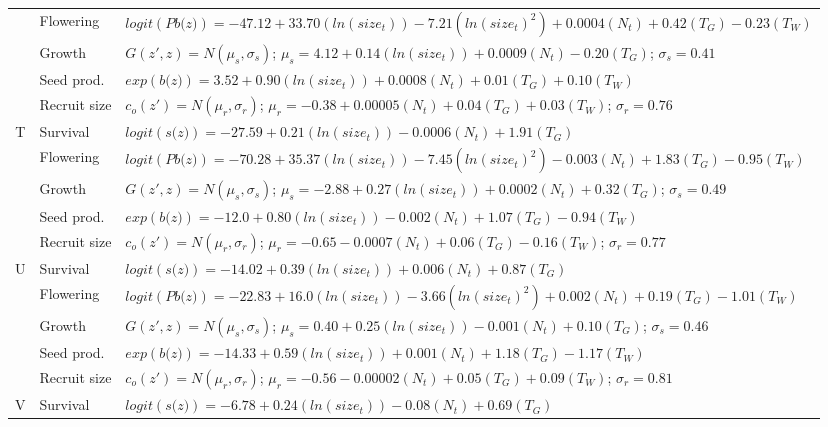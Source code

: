 \documentclass[12pt, letterpaper]{article}
\begin{document}
\begin{spacing}{1.3}
\begin{longtable}[ht]{c|l|p{}}
         & Flowering  & $logit(\textit{Pb(z)}) = -47.12 + 33.70(ln(size_t)) -7.21(ln(size_t)^2) +0.0004 (N_t) + 0.42 (T_G) - 0.23 (T_W)$ \\
         \rowcolor[gray]{.95}& Growth  &  $G(z',z) = N(\mu_s, \sigma_s)$; $\mu_s = 4.12 + 0.14(ln(size_t)) +0.0009(N_t) -0.20 (T_G)$; $\sigma_s = 0.41$\\
         & Seed prod.  & $exp(\textit{b(z)}) = 3.52 + 0.90(ln(size_t)) + 0.0008 (N_t) + 0.01 (T_G) + 0.10 (T_W)$  \\
         \rowcolor[gray]{.95}& Recruit size  &  $c_o(z') = N(\mu_r, \sigma_r)$; $\mu_r = -0.38 + 0.00005 (N_t) + 0.04 (T_G) + 0.03 (T_W) $; $\sigma_r = 0.76$ \\
         \hline
         T  &  Survival  &  $logit(\textit{s(z)})= -27.59 + 0.21(ln(size_t)) -0.0006(N_t) + 1.91 (T_G)$ \\
         \rowcolor[gray]{.95}& Flowering  & $logit(\textit{Pb(z)})  = -70.28 + 35.37(ln(size_t)) -7.45(ln(size_t)^2) - 0.003 (N_t) + 1.83 (T_G) - 0.95 (T_W)$ \\
         & Growth  &  $G(z',z) = N(\mu_s, \sigma_s)$; $\mu_s = -2.88 + 0.27(ln(size_t)) +0.0002 (N_t) + 0.32 (T_G)$; $\sigma_s = 0.49$\\
         \rowcolor[gray]{.95}& Seed prod.  & $exp(\textit{b(z)}) = -12.0 + 0.80(ln(size_t)) -0.002 (N_t) + 1.07 (T_G) - 0.94 (T_W)$  \\
         & Recruit size  &  $c_o(z') = N(\mu_r, \sigma_r)$; $\mu_r = -0.65 -0.0007 (N_t) + 0.06 (T_G) - 0.16 (T_W) $; $\sigma_r = 0.77$ \\
         \hline
         \rowcolor[gray]{.95}U  &  Survival  &  $logit(\textit{s(z)})= -14.02 + 0.39(ln(size_t)) + 0.006(N_t) + 0.87 (T_G)$ \\
         & Flowering  & $logit(\textit{Pb(z)})  = -22.83 + 16.0(ln(size_t)) -3.66(ln(size_t)^2) + 0.002 (N_t) + 0.19 (T_G) - 1.01 (T_W)$ \\
         \rowcolor[gray]{.95}& Growth  &  $G(z',z) = N(\mu_s, \sigma_s)$; $\mu_s = 0.40 + 0.25(ln(size_t)) - 0.001 (N_t) + 0.10 (T_G)$; $\sigma_s = 0.46$\\
         & Seed prod.  & $exp(\textit{b(z)}) = -14.33 + 0.59(ln(size_t)) + 0.001 (N_t) + 1.18 (T_G) - 1.17 (T_W)$  \\
         \rowcolor[gray]{.95}& Recruit size  &  $c_o(z') = N(\mu_r, \sigma_r)$; $\mu_r = -0.56 -0.00002 (N_t) + 0.05 (T_G) + 0.09 (T_W) $; $\sigma_r = 0.81$ \\
         \hline
         V  &  Survival  &  $logit(\textit{s(z)})= -6.78 + 0.24(ln(size_t)) -0.08(N_t) + 0.69 (T_G)$ \\

\end{longtable}
\end{spacing}
\end{document}

